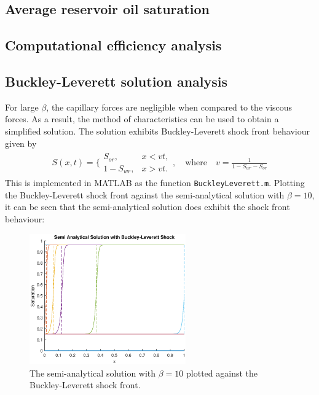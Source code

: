\documentclass[11pt]{article}
\begin{document}
\subsection{Average reservoir oil saturation}


\subsection{Computational efficiency analysis}

\subsection{Buckley-Leverett solution analysis}
For large $\beta$, the capillary forces are negligible when compared to the viscous forces. As a result, the method of characteristics can be used to obtain a simplified solution. The solution exhibits Buckley-Leverett shock front behaviour given by
\begin{eqnarray}
S(x,t) = \bigg\{
\begin{array}{lr}
S_{or}, &x<vt,\\
1-S_{wr}, &x>vt.
\end{array},\quad\text{where} \quad v = \frac{1}{1-S_{wr}-S_{or}}
\end{eqnarray}
This is implemented in MATLAB as the function \verb|BuckleyLeverett.m|. Plotting the Buckley-Leverett shock front against the semi-analytical solution with $\beta=10$, it can be seen that the semi-analytical solution does exhibit the shock front behaviour:

\begin{figure}[!h]
\centering
\includegraphics[width = 0.6\textwidth]{semianalytical-buckleyleverett.eps}
\caption{The semi-analytical solution with $\beta=10$ plotted against the Buckley-Leverett shock front.}
\end{figure}
\end{document}
